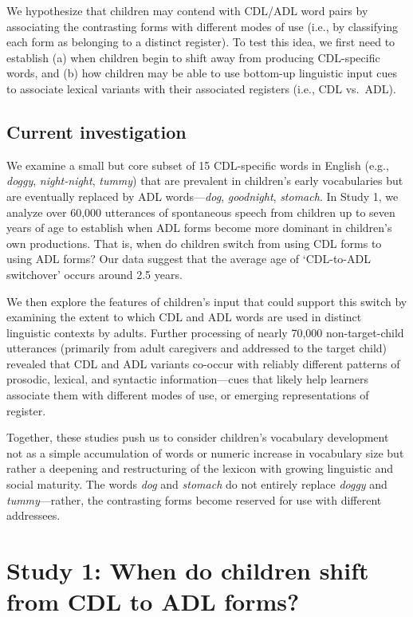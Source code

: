 \documentclass[10pt, letterpaper]{article}
\begin{document}
We hypothesize that children may contend with CDL/ADL word pairs by
associating the contrasting forms with different modes of use (i.e., by
classifying each form as belonging to a distinct register). To test this
idea, we first need to establish (a) when children begin to shift away
from producing CDL-specific words, and (b) how children may be able to
use bottom-up linguistic input cues to associate lexical variants with
their associated registers (i.e., CDL vs.~ADL).

\hypertarget{current-investigation}{%
\subsection{Current investigation}\label{current-investigation}}

We examine a small but core subset of 15 CDL-specific words in English
(e.g., \emph{doggy}, \emph{night-night}, \emph{tummy}) that are
prevalent in children's early vocabularies but are eventually replaced
by ADL words---\emph{dog}, \emph{goodnight}, \emph{stomach}. In Study 1,
we analyze over 60,000 utterances of spontaneous speech from children up
to seven years of age to establish when ADL forms become more dominant
in children's own productions. That is, when do children switch from
using CDL forms to using ADL forms? Our data suggest that the average
age of `CDL-to-ADL switchover' occurs around 2.5 years.

We then explore the features of children's input that could support this
switch by examining the extent to which CDL and ADL words are used in
distinct linguistic contexts by adults. Further processing of nearly
70,000 non-target-child utterances (primarily from adult caregivers and
addressed to the target child) revealed that CDL and ADL variants
co-occur with reliably different patterns of prosodic, lexical, and
syntactic information---cues that likely help learners associate them
with different modes of use, or emerging representations of register.

Together, these studies push us to consider children's vocabulary
development not as a simple accumulation of words or numeric increase in
vocabulary size but rather a deepening and restructuring of the lexicon
with growing linguistic and social maturity. The words \emph{dog} and
\emph{stomach} do not entirely replace \emph{doggy} and
\emph{tummy}---rather, the contrasting forms become reserved for use
with different addressees.

\hypertarget{study-1-when-do-children-shift-from-cdl-to-adl-forms}{%
\section{Study 1: When do children shift from CDL to ADL
forms?}\label{study-1-when-do-children-shift-from-cdl-to-adl-forms}}
\end{document}
